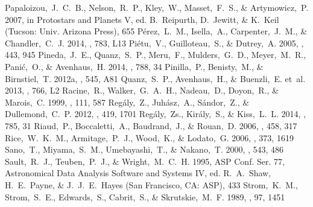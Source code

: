 \documentclass[apj]{emulateapj-rtx4}
\begin{document}
\begin{thebibliography}{}
   Papaloizou,~J.~C.~B., Nelson,~R.~P., Kley,~W., Masset,~F.~S., \& Artymowicz,~P. 2007, in Protostars and Planets V, ed. B.~Reipurth, D.~Jewitt, \& K.~Keil (Tucson: Univ. Arizona Press), 655
   P\'{e}rez,~L.~M., Isella,~A., Carpenter,~J.~M., \& Chandler,~C.~J. 2014, \apj, 783, L13
   Pi\'{e}tu,~V., Guilloteau,~S., \& Dutrey,~A. 2005, \aap, 443, 945 
   Pineda,~J.~E., Quanz,~S.~P., Meru,~F., Mulders,~G.~D., Meyer,~M.~R., Pani\'{c},~O., \& Avenhaus,~H. 2014, \apj, 788, 34
   Pinilla,~P., Benisty,~M., \& Birnstiel,~T. 2012a, \aap, 545, A81 
   Quanz,~S.~P., Avenhaus,~H., \& Buenzli,~E. et~al. 2013, \apjl, 766, L2
   Racine,~R., Walker,~G.~A.~H., Nadeau,~D., Doyon,~R., \& Marois,~C. 1999, \pasp, 111, 587 
   Reg\'{a}ly,~Z., Juh\'{a}sz,~A., S\'{a}ndor,~Z., \& Dullemond,~C.~P. 2012, \mnras, 419, 1701 
   Reg\'{a}ly,~Zs., Kir\'{a}ly,~S., \& Kiss,~L.~L. 2014, \apj, 785, 31
   Riaud,~P., Boccaletti,~A., Baudrand,~J., \& Rouan,~D. 2006, \aap, 458, 317
   Rice,~W.~K.~M., Armitage,~P.~J., Wood,~K., \& Lodato,~G. 2006, \mnras, 373, 1619 
   Sano,~T., Miyama,~S.~M., Umebayashi,~T., \& Nakano,~T. 2000, \apj, 543, 486 
   Sault,~R.~J., Teuben,~P.~J., \& Wright,~M.~C.~H. 1995, ASP Conf. Ser. 77, Astronomical Data Analysis Software and Systems IV, ed. R.~A.~Shaw, H.~E.~Payne, \& J.~J.~E.~Hayes (San Francisco, CA: ASP), 433 
   Strom,~K.~M., Strom,~S.~E., Edwards,~S., Cabrit,~S., \& Skrutskie,~M.~F. 1989, \aj, 97, 1451

\end{thebibliography}
\end{document}
